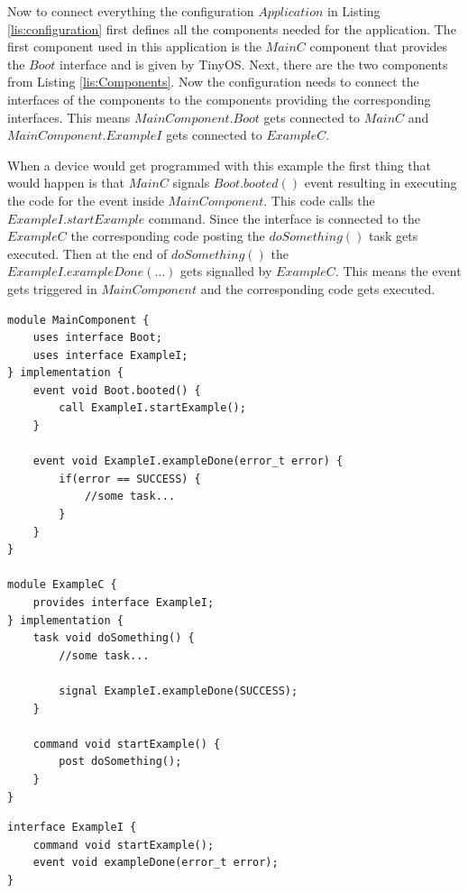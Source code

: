 Now to connect everything the configuration $Application$ in Listing \ref{lis:configuration} first defines all the components needed for the application. The first component used in this application is the $MainC$ component that provides the $Boot$ interface and is given by TinyOS. Next, there are the two components from Listing \ref{lis:Components}. Now the configuration needs to connect the interfaces of the components to the components providing the corresponding interfaces. This means $MainComponent.Boot$ gets connected to $MainC$ and $MainComponent.ExampleI$ gets connected to $ExampleC$.

When a device would get programmed with this example the first thing that would happen is that $MainC$ signals $Boot.booted()$ event resulting in executing the code for the event inside $MainComponent$. This code calls the $ExampleI.startExample$ command. Since the interface is connected to the $ExampleC$ the corresponding code posting the $doSomething()$ task gets executed. Then at the end of $doSomething()$ the $ExampleI.exampleDone(...)$ gets signalled by $ExampleC$. This means the event gets triggered in $MainComponent$ and the corresponding code gets executed. \cite{Tinyos} \cite{TinyosT}     

\begin{lstlisting}
module MainComponent {
	uses interface Boot;
	uses interface ExampleI;
} implementation {
	event void Boot.booted() {
		call ExampleI.startExample();
	}
	
	event void ExampleI.exampleDone(error_t error) {
		if(error == SUCCESS) {
			//some task...
		}
	}
}

module ExampleC {
	provides interface ExampleI;
} implementation {
	task void doSomething() {
		//some task...
		
		signal ExampleI.exampleDone(SUCCESS);
	}
	
	command void startExample() {
		post doSomething();
	}
}
\end{lstlisting}


\begin{lstlisting}
interface ExampleI {
	command void startExample();
	event void exampleDone(error_t error);
}
\end{lstlisting}

